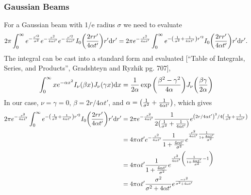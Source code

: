 \documentclass[]{article}
\begin{document}
\subsubsection{Gaussian Beams}
For a Gaussian beam with 1/e radius $\sigma$ we need to evaluate
\begin{equation*}
  2\pi \int_0^\infty
  e^{-\frac{r'^2}{\sigma^2}}
  e^{-\frac{r^2}{4\alpha t'}}e^{-\frac{r'^2}{4\alpha t'}}I_0\qty(\frac{2rr'}{4\alpha t'}) r'\dd r'
  =
  2\pi e^{-\frac{r^2}{4\alpha t'}}\int_0^\infty
  e^{-\qty(\frac{1}{\sigma^2} + \frac{1}{4\alpha t'})r'^2}
  I_0\qty(\frac{2rr'}{4\alpha t'}) r'\dd r'.
\end{equation*}
The integral can be cast into a standard form and evaluated [``Table of Integrals, Series, and Products'', Gradshteyn and Ryzhik pg. 707],
\begin{equation*}
  \int_0^\infty x e^{-\alpha x^2} I_\nu\qty(\beta x) J_\nu(\gamma x) \dd x = \frac{1}{2\alpha} \exp\qty(\frac{\beta^2 - \gamma^2}{4\alpha}) J_\nu\qty(\frac{\beta\gamma}{2\alpha})
\end{equation*}
In our case, $\nu = \gamma = 0$, $\beta = 2r/4\alpha t'$, and $\alpha = \qty(\frac{1}{\sigma^2} + \frac{1}{4\alpha t'})$, which gives
\begin{align*}
  2\pi e^{-\frac{r^2}{4\alpha t'}}\int_0^\infty
  e^{-\qty(\frac{1}{\sigma^2} + \frac{1}{4\alpha t'})r'^2}
  I_0\qty(\frac{2rr'}{4\alpha t'}) r'\dd r'
  &=
  2\pi e^{-\frac{r^2}{4\alpha t'}}
  \frac{1}{2\qty(\frac{1}{\sigma^2} + \frac{1}{4\alpha t'})}  e^{\qty(2r/4\alpha t')^2/4\qty(\frac{1}{\sigma^2} + \frac{1}{4\alpha t'})} \\
  &=
  4\pi\alpha t' e^{-\frac{r^2}{4\alpha t'}}
  \frac{1}{1 + \frac{4\alpha t'}{\sigma^2}}
  e^{\frac{r^2}{4\alpha t'} \frac{1}{ 1 + \frac{4\alpha t'}{\sigma^2}} } \\
  &=
  4\pi\alpha t'
  \frac{1}{1 + \frac{4\alpha t'}{\sigma^2}}
  e^{\frac{r^2}{4\alpha t'} \qty(\frac{1}{ 1 + \frac{4\alpha t'}{\sigma^2}}-1) } \\
  &=
  4\pi\alpha t'
  \frac{\sigma^2}{\sigma^2 + 4\alpha t'}
  e^{\frac{-r^2}{\sigma^2 + 4\alpha t'}  }
\end{align*}
\end{document}
